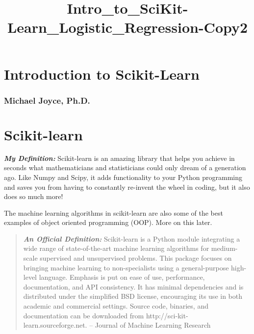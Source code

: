 \documentclass[11pt]{article}
\title{Intro\_to\_SciKit-Learn\_Logistic\_Regression-Copy2}
\begin{document}
    
    
    \maketitle
    
    

    
    \hypertarget{introduction-to-scikit-learn}{%
\section{Introduction to
Scikit-Learn}\label{introduction-to-scikit-learn}}

\hypertarget{michael-joyce-ph.d.}{%
\subsubsection{Michael Joyce, Ph.D.}\label{michael-joyce-ph.d.}}

    \hypertarget{scikit-learn}{%
\section{Scikit-learn}\label{scikit-learn}}

    \textbf{\emph{My Definition:}} Scikit-learn is an amazing library that
helps you achieve in seconds what mathematicians and statisticians could
only dream of a generation ago. Like Numpy and Scipy, it adds
functionality to your Python programming and saves you from having to
constantly re-invent the wheel in coding, but it also does so much more!

The machine learning algorithms in scikit-learn are also some of the
best examples of object oriented programming (OOP). More on this later.

    \begin{quote}
\textbf{\emph{An Official Definition:}} Scikit-learn is a Python module
integrating a wide range of state-of-the-art machine learning algorithms
for medium-scale supervised and unsupervised problems. This package
focuses on bringing machine learning to non-specialists using a
general-purpose high-level language. Emphasis is put on ease of use,
performance, documentation, and API consistency. It has minimal
dependencies and is distributed under the simplified BSD license,
encouraging its use in both academic and commercial settings. Source
code, binaries, and documentation can be downloaded from
http://sci-kit-learn.sourceforge.net. -- Journal of Machine Learning
Research
\end{quote}
\end{document}
